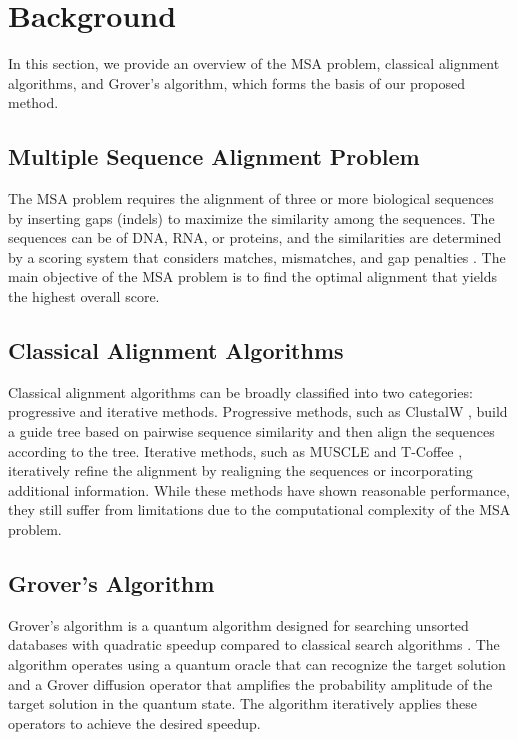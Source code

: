 \section{Background}

In this section, we provide an overview of the MSA problem, classical alignment algorithms, and Grover's algorithm, which forms the basis of our proposed method.

\subsection{Multiple Sequence Alignment Problem}

The MSA problem requires the alignment of three or more biological sequences by inserting gaps (indels) to maximize the similarity among the sequences. The sequences can be of DNA, RNA, or proteins, and the similarities are determined by a scoring system that considers matches, mismatches, and gap penalties \cite{thompson1994clustal}. The main objective of the MSA problem is to find the optimal alignment that yields the highest overall score.

\subsection{Classical Alignment Algorithms}

Classical alignment algorithms can be broadly classified into two categories: progressive and iterative methods. Progressive methods, such as ClustalW \cite{thompson1994clustal}, build a guide tree based on pairwise sequence similarity and then align the sequences according to the tree. Iterative methods, such as MUSCLE \cite{edgar2004muscle} and T-Coffee \cite{notredame2000tcoffee}, iteratively refine the alignment by realigning the sequences or incorporating additional information. While these methods have shown reasonable performance, they still suffer from limitations due to the computational complexity of the MSA problem.

\subsection{Grover's Algorithm}

Grover's algorithm is a quantum algorithm designed for searching unsorted databases with quadratic speedup compared to classical search algorithms \cite{grover1996fast}. The algorithm operates using a quantum oracle that can recognize the target solution and a Grover diffusion operator that amplifies the probability amplitude of the target solution in the quantum state. The algorithm iteratively applies these operators to achieve the desired speedup.

